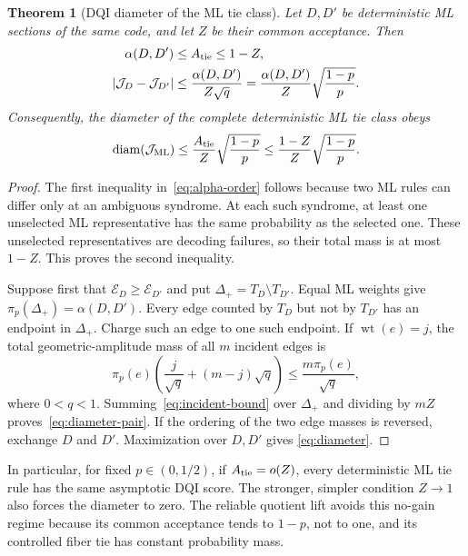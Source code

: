\documentclass[journal]{IEEEtran}
\newtheorem{theorem}{Theorem}
\theoremstyle{definition}
\theoremstyle{remark}
\newcommand{\wt}{\operatorname{wt}}
\begin{document}
\begin{theorem}[DQI diameter of the ML tie class]
\label{thm:tie-diameter}
Let $D,D'$ be deterministic ML sections of the same code, and let $Z$ be
their common acceptance.  Then
\begin{align}
 \alpha(D,D')&\le A_{\rm tie}\le1-Z,
 \label{eq:alpha-order}\\
 |\mathcal J_D-\mathcal J_{D'}|
 &\le \frac{\alpha(D,D')}{Z\sqrt q}
 =\frac{\alpha(D,D')}{Z}\sqrt{\frac{1-p}{p}}.
 \label{eq:diameter-pair}
\end{align}
Consequently, the diameter of the complete deterministic ML tie class obeys
\begin{equation}
 \operatorname{diam}(\mathcal J_{\rm ML})
 \le\frac{A_{\rm tie}}{Z}\sqrt{\frac{1-p}{p}}
 \le\frac{1-Z}{Z}\sqrt{\frac{1-p}{p}}.
 \label{eq:diameter}
\end{equation}
\end{theorem}

\begin{proof}
The first inequality in~\eqref{eq:alpha-order} follows because two ML rules
can differ only at an ambiguous syndrome.  At each such syndrome, at least one
unselected ML representative has the same probability as the selected one.
These unselected representatives are decoding failures, so their total mass
is at most $1-Z$.  This proves the second inequality.

Suppose first that $\mathcal E_D\ge\mathcal E_{D'}$ and put
$\Delta_+=T_D\setminus T_{D'}$.  Equal ML weights give
$\pi_p(\Delta_+)=\alpha(D,D')$.  Every edge counted by $T_D$ but not by
$T_{D'}$ has an endpoint in $\Delta_+$.  Charge such an edge to one such
endpoint.  If $\wt(e)=j$, the total
geometric-amplitude mass of all $m$ incident edges is
\begin{equation}
 \pi_p(e)\left(\frac{j}{\sqrt q}+(m-j)\sqrt q\right)
 \le \frac{m\pi_p(e)}{\sqrt q},
 \label{eq:incident-bound}
\end{equation}
where $0<q<1$.  Summing~\eqref{eq:incident-bound} over $\Delta_+$ and dividing
by $mZ$ proves~\eqref{eq:diameter-pair}.  If the ordering of the two edge
masses is reversed, exchange $D$ and $D'$.  Maximization over $D,D'$ gives
\eqref{eq:diameter}.
\end{proof}

In particular, for fixed $p\in(0,1/2)$, if $A_{\rm tie}=o(Z)$, every
deterministic ML tie rule has the same asymptotic DQI score.  The stronger,
simpler condition $Z\to1$ also forces the diameter to zero.  The reliable
quotient lift avoids this no-gain regime because its
common acceptance tends to $1-p$, not to one, and its controlled fiber tie has
constant probability mass.
\end{document}
